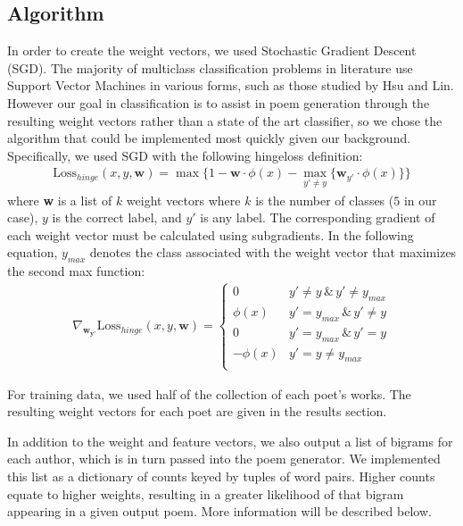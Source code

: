 \documentclass[journal]{IEEEtran}
\begin{document}
\subsection{Algorithm}
In order to create the weight vectors, we used Stochastic Gradient Descent (SGD). The majority of multiclass classification problems in literature use Support Vector Machines in various forms, such as those studied by Hsu and Lin\cite{Hsu:article_typical}. However our goal in classification is to assist in poem generation through the resulting weight vectors rather than a state of the art classifier, so we chose the algorithm that could be implemented most quickly given our background. Specifically, we used SGD with the following hingeloss definition: 
\begin{align}
    \text{Loss}_{hinge}(x,y,\mathbf{w}) = \max\lbrace 1-\mathbf{w}\cdot \phi(x)  - \max_{y'\neq y}\lbrace \mathbf{w}_{y'}\cdot \phi(x) \rbrace\rbrace  
\end{align}
where \textbf{w} is a list of $k$ weight vectors where $k$ is the number of classes ($5$ in our case), $y$ is the correct label, and $y'$ is any label. 
The corresponding gradient of each weight vector must be calculated using subgradients. In the following equation, $y_{max}$ denotes the class associated with the weight vector that maximizes the second max function:
\begin{align}
\nabla_\mathbf{w_{y'}}\text{Loss}_{hinge}(x,y,\mathbf{w}) = \begin{cases}
0 & y' \neq y\, \&\, y' \neq y_{max}\\
\phi(x) & y' = y_{max}\, \&\,y' \neq y\\
0 & y' = y_{max}\, \&\, y' = y\\
-\phi(x) & y' = y \neq y_{max}\\
\end{cases}
\end{align}

For training data, we used half of the collection of each poet’s works. The resulting weight vectors for each poet are given in the results section.

In addition to the weight and feature vectors, we also output a list of bigrams for each author, which is in turn passed into the poem generator. We implemented this list as a dictionary of counts keyed by tuples of word pairs. Higher counts equate to higher weights, resulting in a greater likelihood of that bigram appearing in a given output poem. More information will be described below.
\end{document}
